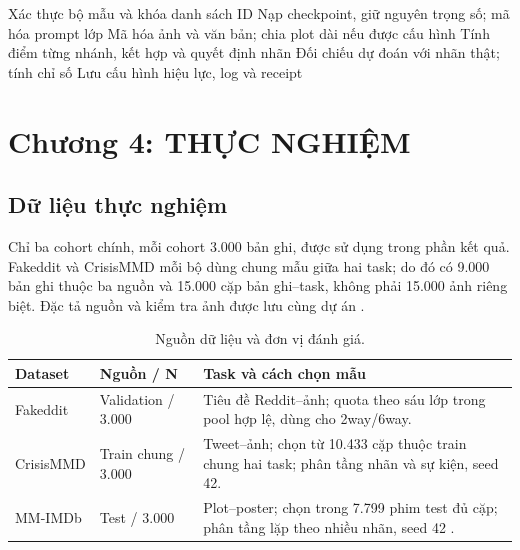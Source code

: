 \documentclass[12pt,a4paper]{article}
\begin{document}
\begin{algorithm}[H]
\caption{Quy trình đánh giá một cấu hình zero-shot}
Xác thực bộ mẫu và khóa danh sách ID\;
Nạp checkpoint, giữ nguyên trọng số; mã hóa prompt lớp\;
Mã hóa ảnh và văn bản; chia plot dài nếu được cấu hình\;
Tính điểm từng nhánh, kết hợp và quyết định nhãn\;
Đối chiếu dự đoán với nhãn thật; tính chỉ số\;
Lưu cấu hình hiệu lực, log và receipt\;
\end{algorithm}

\newpage
\section{Chương 4: THỰC NGHIỆM}
\subsection{Dữ liệu thực nghiệm}
Chỉ ba cohort chính, mỗi cohort 3.000 bản ghi, được sử dụng trong phần kết quả. Fakeddit và CrisisMMD mỗi bộ dùng chung mẫu giữa hai task; do đó có 9.000 bản ghi thuộc ba nguồn và 15.000 cặp bản ghi--task, không phải 15.000 ảnh riêng biệt. Đặc tả nguồn và kiểm tra ảnh được lưu cùng dự án \cite{dataaudit}.
\begin{table}[H]\centering\small
\caption{Nguồn dữ liệu và đơn vị đánh giá.}\label{tab:data}
\begin{tabular}{p{}p{}p{}}\toprule
\textbf{Dataset}&\textbf{Nguồn / N}&\textbf{Task và cách chọn mẫu}\\\midrule
Fakeddit&Validation / 3.000&Tiêu đề Reddit--ảnh; quota theo sáu lớp trong pool hợp lệ, dùng cho 2way/6way.\\
CrisisMMD&Train chung / 3.000&Tweet--ảnh; chọn từ 10.433 cặp thuộc train chung hai task; phân tầng nhãn và sự kiện, seed 42.\\
MM-IMDb&Test / 3.000&Plot--poster; chọn trong 7.799 phim test đủ cặp; phân tầng lặp theo nhiều nhãn, seed 42 \cite{multilabel-stratification}.\\
\bottomrule\end{tabular}\end{table}
\end{document}
